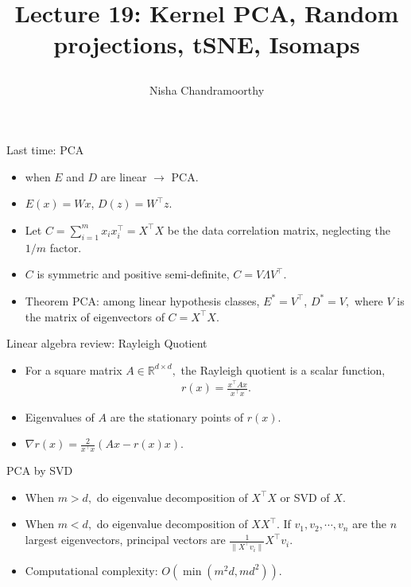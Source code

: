 \documentclass[final]{beamer}
\title{\begin{huge}{Lecture 19: Kernel PCA, Random projections, tSNE, Isomaps}\end{huge}} %
\author{Nisha Chandramoorthy} %
\begin{document}
\frame{\titlepage}

\begin{frame}{Last time: PCA}
	\begin{itemize}
	\item when $E$ and $D$ are linear $\to$ PCA.
	\pause 
	\item $E(x) = Wx$, $D(z) = W^\top z$.
	\pause
\item Let $C = \sum_{i=1}^m x_i x_i^\top = X^\top X$ be the data correlation matrix, neglecting the $1/m$ factor.
	\pause 
	\item $C$ is symmetric and positive semi-definite, $C = V \Lambda V^\top$.
	\item Theorem PCA: among linear hypothesis classes, $E^* = V^\top$, $D^* = V,$ where $V$ is the matrix of eigenvectors of $C = X^\top X$.
	\end{itemize}
\end{frame}
\begin{frame}{Linear algebra review: Rayleigh Quotient}
\begin{itemize}
	\item For a square matrix $A \in \mathbb{R}^{d\times d},$ the Rayleigh quotient is a scalar function,
	\begin{align*}
		r(x) = \frac{x^\top A x}{x^\top x}.
	\end{align*}
	\pause
	\item Eigenvalues of $A$ are the stationary points of $r(x)$.
	\pause
	\item $\nabla r(x) = \frac{2}{x^\top x} (Ax - r(x)x)$.
\end{itemize}
\end{frame}
\begin{frame}{PCA by SVD}
	\begin{itemize}
		\item When $m > d,$ do eigenvalue decomposition of $X^\top X$ or SVD of $X$.
		\pause
		\item When $m < d,$ do eigenvalue decomposition of $XX^\top.$ If $v_1, v_2,\cdots, v_n$ are the $n$ largest eigenvectors, principal vectors are $\frac{1}{\|X^\top v_i\|} X^\top v_i$.
		\pause
		\item Computational complexity: $O(\min(m^2d, md^2))$.

	\end{itemize}

\end{frame}
\end{document}
